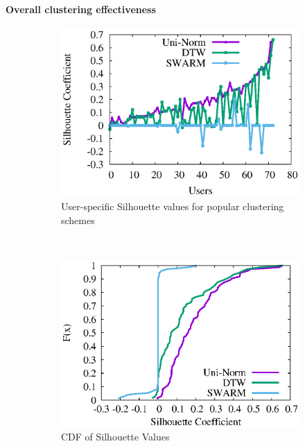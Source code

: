 \paragraph{Overall clustering effectiveness}
\begin{figure}
\centering     
\begin{subfigure}[t]{.32\textwidth}
\includegraphics[scale=0.4]{figs/silFinal.eps}
\caption{User-specific Silhouette values for popular clustering schemes}
\label{fig:SWARM_OD}  
\end{subfigure}
~
\begin{subfigure}[t]{.32\textwidth}
\includegraphics[scale=0.4]{figs/sil_cdfFinal.eps}
\caption{CDF of Silhouette Values}
\label{fig:cdf_sil}  
\end{subfigure}
~
\begin{subfigure}[t]{.32\textwidth}

\end{subfigure}
\end{figure}
